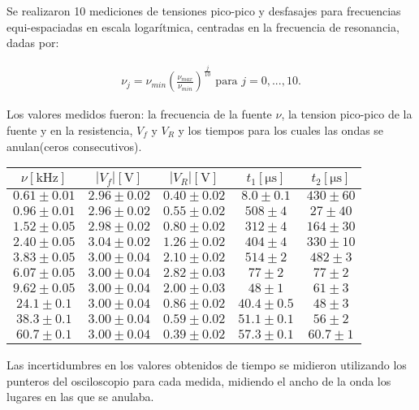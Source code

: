 \documentclass[12pt,a4paper]{article}
\begin{document}
Se realizaron 10 mediciones de tensiones pico-pico y desfasajes para frecuencias equi-espaciadas en escala logarítmica, centradas en la frecuencia de resonancia, dadas por: 

\begin{align*}
\nu_j = \nu_{min}\left(\frac{\nu_{max}}{\nu_{min}}\right)^{\frac{j}{10}} \text{                para } j = 0,...,10.
\end{align*}
 
Los valores medidos fueron: la frecuencia de la fuente $\nu$, la tension pico-pico de la fuente y en la resistencia, $V_f$ y $V_R$ y los tiempos para los cuales las ondas se anulan(ceros consecutivos).

\begin{table}[H]
\centering
\begin{tabular}{@{}|c|c|c|c|c|@{}}
$\nu [\si\kilo\si\hertz]$  & $|V_f| [\si\volt]$ & $|V_R| [\si\volt]$  & $ t_1 [\si\micro\si\second] $ & $ t_2 [\si\micro\si\second] $                             
                \\ \hline
$0.61 \pm 0.01$ & $2.96 \pm 0.02$ & $0.40 \pm 0.02$ & $8.0 \pm 0.1$    & $430 \pm 60$ \\
$0.96 \pm 0.01$ & $2.96\pm 0.02$  & $0.55 \pm 0.02$ & $508 \pm 4$    & $27 \pm 40$  \\
$1.52 \pm 0.05$ & $2.98\pm 0.02$  & $0.80 \pm 0.02$ & $312 \pm 4$    & $164 \pm 30$ \\
$2.40\pm 0.05$  & $3.04 \pm 0.02$ & $1.26 \pm 0.02$ & $404 \pm 4$    & $330 \pm 10$ \\
$3.83\pm 0.05$  & $3.00 \pm 0.04$ & $2.10 \pm 0.02$ & $514 \pm 2$    & $482 \pm 3$  \\
$6.07\pm 0.05$  & $3.00 \pm 0.04$ & $2.82 \pm 0.03$ & $77 \pm 2$     & $77 \pm 2$   \\
$9.62\pm 0.05$  & $3.00 \pm 0.04$ & $2.00 \pm 0.03$ & $48 \pm 1$     & $61 \pm 3$   \\
$24.1\pm 0.1$   & $3.00 \pm 0.04$ & $0.86 \pm 0.02$ & $40.4 \pm 0.5$ & $48\pm 3$    \\
$38.3\pm 0.1$   & $3.00 \pm 0.04$ & $0.59 \pm 0.02$ & $51.1 \pm 0.1$ & $56 \pm 2$   \\
$60.7\pm 0.1$   & $3.00 \pm 0.04$ & $0.39 \pm 0.02$ & $57.3 \pm 0.1$ & $60.7 \pm 1$
\end{tabular}
\end{table}

Las incertidumbres en los valores obtenidos de tiempo se midieron utilizando los punteros del osciloscopio para cada medida, midiendo el ancho de la onda los lugares en las que se anulaba.
\end{document}
